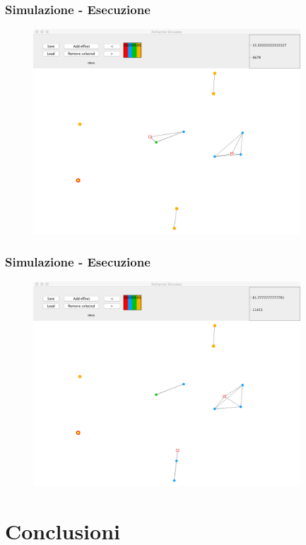 \documentclass[handout]{beamer}\mode<presentation>{\usetheme{AMSCesenaBleu}}
\begin{document}
\begin{frame}
\frametitle{Simulazione - Esecuzione}
\vspace*{-0.25cm}
\begin{figure}
\includegraphics[width=10cm]{images/simul_harvest.png}
\end{figure}
\end{frame}

\begin{frame}
\frametitle{Simulazione - Esecuzione}
\vspace*{-0.25cm}
\begin{figure}
\includegraphics[width=10cm]{images/simul_harvest2.png}
\end{figure}
\end{frame}


\section{Conclusioni}
\end{document}
